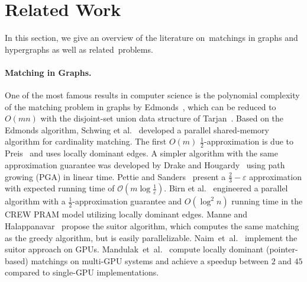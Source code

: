 \documentclass[runningheads]{llncs}
\begin{document}
\section{Related Work}\label{sec:relwork}
\noindent In this section, we give an overview of the literature on~matchings in graphs and hypergraphs as well as related~problems.
\paragraph{Matching in Graphs.} One of the most famous results in computer science is the polynomial complexity of the matching problem in graphs by Edmonds~\cite{edmonds_1965}, which can be reduced to $O(mn)$ with the disjoint-set union data structure of Tarjan~\cite{DBLP:journals/jcss/GabowT85}. Based on the Edmonds algorithm, Schwing et al.~\cite{DBLP:conf/ipps/SchwingGS24} developed a parallel shared-memory algorithm for cardinality matching.
The first $O(m)$ $\frac{1}{2}$-approximation is due to Preis~\cite{preis1999linear} and uses locally dominant edges.
A simpler algorithm with the same approximation guarantee was developed by Drake and Hougardy~\cite{DH03a} using path growing (PGA) in linear time. Pettie and Sanders~\cite{PETTIE2004271} present a $\frac{2}{3}-\varepsilon$ approximation with expected running time of $\mathcal{O}(m\log{\frac{1}{\varepsilon}})$.
Birn et al.~\cite{birn2013efficient} engineered a parallel algorithm with a $\frac{1}{2}$-approximation guarantee and $O(\log^2{n})$ running time in the CREW PRAM model utilizing locally dominant edges.
Manne and Halappanavar~\cite{manne2014new} propose the suitor algorithm, which computes the same matching as the greedy algorithm, but is easily parallelizable.
Naim~et~al.~\cite{naim2015optimizing} implement the suitor approach on GPUs.
Mandulak~et~al.~\cite{mandulak2024efficient} compute locally dominant (pointer-based) matchings on multi-GPU systems and achieve a speedup between $2$ and $45$ compared to single-GPU implementations.
\end{document}
